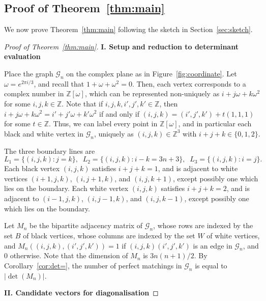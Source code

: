 \documentclass{article}
\begin{document}
\subsection{Proof of Theorem~\ref{thm:main}}
We now prove Theorem~\ref{thm:main} following the sketch in Section~\ref{sec:sketch}.
\begin{proof}[Proof of Theorem~\ref{thm:main}] \mbox{}%

\medskip

\textbf{I. Setup and reduction to determinant evaluation}

Place the graph $\mathcal{G}_n$ on the complex plane as in Figure~\ref{fig:coordinate}. Let $\omega=e^{2\pi i/3}$, and recall that $1+\omega+\omega^2=0$. Then, each vertex corresponds to a complex number in $\mathbb{Z}[\omega]$, which can be represented non-uniquely as $i+j\omega+k\omega^2$ for some $i,j,k\in\mathbb{Z}$. Note that if $i,j,k,i',j',k'\in\mathbb{Z}$, then $i+j\omega+k\omega^2=i'+j'\omega+k'\omega^2$ if and only if $(i,j,k)=(i',j',k')+t(1,1,1)$ for some $t\in\mathbb{Z}$. Thus, we can label every point in $\mathbb{Z}[\omega]$, and in particular each black and white vertex in $\mathcal{G}_n$, uniquely as $(i,j,k)\in\mathbb{Z}^3$ with $i+j+k\in\{0,1,2\}$. 

The three boundary lines are 
\[L_1=\{(i,j,k):j=k\},\;\;L_2=\{(i,j,k):i-k=3n+3\},\;\;L_3=\{(i,j,k):i=j\}.\]
Each black vertex $(i,j,k)$ satisfies $i+j+k=1$, and is adjacent to white vertices $(i+1,j,k)$, $(i,j+1,k)$, and $(i,j,k+1)$, except possibly one which lies on the boundary. Each white vertex $(i,j,k)$ satisfies $i+j+k=2$, and is adjacent to $(i-1,j,k)$, $(i,j-1,k)$, and $(i,j,k-1)$, except possibly one which lies on the boundary.

Let $M_n$ be the bipartite adjacency matrix of $\mathcal{G}_n$, whose rows are indexed by the set $B$ of black vertices, whose columns are indexed by the set $W$ of white vertices, and $M_n((i,j,k),(i',j',k'))=1$ if $(i,j,k)(i',j',k')$ is an edge in $\mathcal{G}_n$, and 0 otherwise. Note that the dimension of $M_n$ is $3n(n+1)/2$. By Corollary~\ref{cor:det=}, the number of perfect matchings in $\mathcal{G}_n$ is equal to $|\det(M_n)|$.

\medskip

\textbf{II. Candidate vectors for diagonalisation}


\end{proof}
\end{document}
